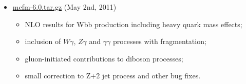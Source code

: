 \begin{itemize}
\item \href{https://mcfm.fnal.gov/downloads/mcfm-6.0.tar.gz}{mcfm-6.0.tar.gz} (May 2nd, 2011)

\begin{itemize}
\item    NLO results for Wbb production including heavy quark mass effects;
\item   inclusion of $W\gamma$, $Z\gamma$ and $\gamma\gamma$ processes with fragmentation;
\item    gluon-initiated contributions to diboson processes;
\item    small correction to Z+2 jet process and other bug fixes. 
\end{itemize}

\end{itemize}
